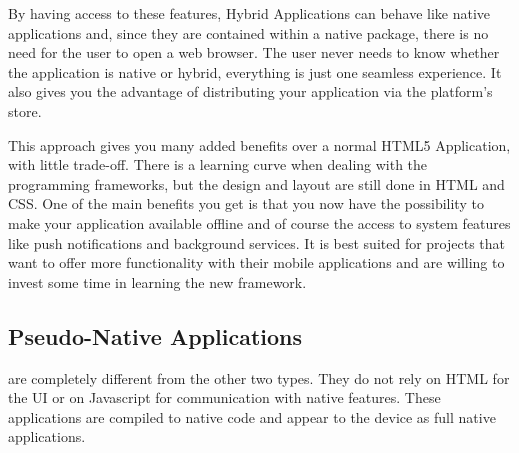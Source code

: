 By having access to these features, Hybrid Applications can behave like native applications and, since they are contained within a native package, there is no need for the user to open a web browser. The user never needs to know whether the application is native or hybrid, everything is just one seamless experience. It also gives you the advantage of distributing your application via the platform's store.


This approach gives you many added benefits over a normal HTML5 Application, with little trade-off. There is a learning curve when dealing with the programming frameworks, but the design and layout are still done in HTML and CSS. One of the main benefits you get is that you now have the possibility to make your application available offline and of course the access to system features like push notifications and background services. It is best suited for projects that want to offer more functionality with their mobile applications and are willing to invest some time in learning the new framework.  

\subsection{Pseudo-Native Applications}\label{sec:pseudo_app}
 are completely different from the other two types. They do not rely on HTML for the UI or on Javascript for communication with native features. These applications are compiled to native code and appear to the device as full native applications. 
















  
